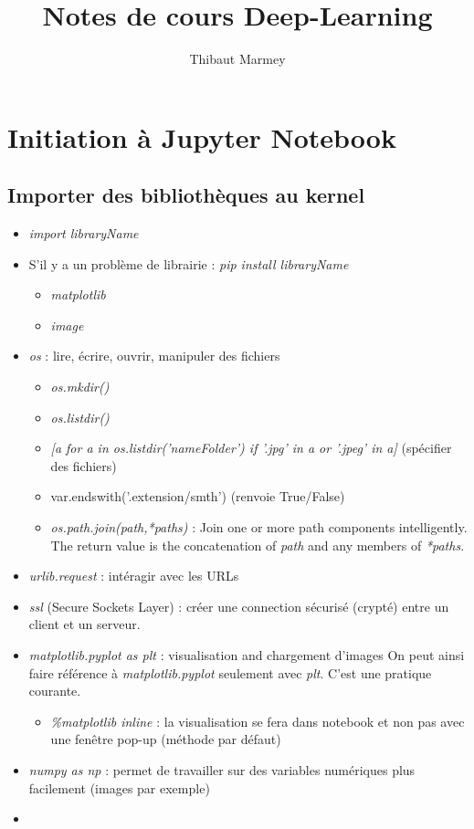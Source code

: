 \documentclass[12pt,a4paper]{article}
\author{Thibaut Marmey}
\title{Notes de cours Deep-Learning}
\begin{document}
	\maketitle

\begin{normalsize}
\tableofcontents
\end{normalsize}

\section{Initiation à Jupyter Notebook}

\subsection{Importer des bibliothèques au kernel}
\begin{itemize}
\item \textit{import libraryName}
\item S'il y a un problème de librairie : \textit{pip install libraryName}
\begin{itemize}
\item \textit{matplotlib}
\item \textit{image}
\end{itemize}
\item \textit{os} : lire, écrire, ouvrir, manipuler des fichiers
\begin{itemize}
\item \textit{os.mkdir()}
\item \textit{os.listdir()}
\item \textit{[a for a in os.listdir('nameFolder') if '.jpg' in a or '.jpeg' in a]} (spécifier des fichiers)
\item var.endswith('.extension/smth') (renvoie True/False)
\item \textit{os.path.join(path,*paths)} : Join one or more path components intelligently. The return value is the concatenation of \textit{path} and any members of \textit{*paths}.
\end{itemize}
\item \textit{urlib.request} : intéragir avec les URLs
\item \textit{ssl} (Secure Sockets Layer) : créer une connection sécurisé (crypté) entre un client et un serveur.
\item \textit{matplotlib.pyplot as plt} : visualisation and chargement d'images
\newline On peut ainsi faire référence à \textit{matplotlib.pyplot} seulement avec \textit{plt}. C'est une pratique courante.
\begin{itemize}
\item \textit{\%matplotlib inline} : la visualisation se fera dans notebook et non pas avec une fenêtre pop-up (méthode par défaut)
\end{itemize}
\item \textit{numpy as np} : permet de travailler sur des variables numériques plus facilement (images par exemple)
\item 
\end{itemize}
\end{document}
